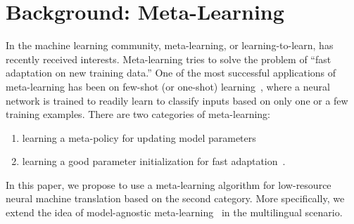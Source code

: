 \section{Background: Meta-Learning}






In the machine learning community, meta-learning, or learning-to-learn, has recently received interests. Meta-learning tries to solve the problem of “fast adaptation on new training data.”  One of the most successful applications of meta-learning has been on few-shot (or one-shot) learning~\citep{lake2015human}, where a neural network is trained to readily learn to classify inputs based on only one or a few training examples. There are two categories of meta-learning:
\begin{enumerate}
    \item learning a meta-policy for updating model parameters~\citep[see, e.g.,][]{andrychowicz2016learning,ha2016hypernetworks,mishra2017meta}
    \item  learning a good parameter initialization for fast adaptation~\citep[see, e.g.,][]{finn2017model,vinyals2016matching,snell2017prototypical}. 
\end{enumerate}
In this paper, we propose to use a meta-learning algorithm for low-resource neural machine translation based on the second category. More specifically, we extend the idea of model-agnostic meta-learning~\citep[MAML,][]{finn2017model} in the multilingual scenario.

